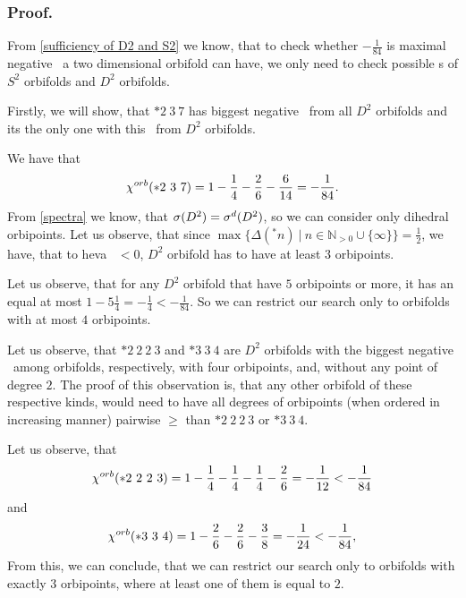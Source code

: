 \subsubsection{Proof.}
From \ref{sufficiency of D2 and S2} we know, that to check whether $-\frac{1}{84}$ is maximal 
negative \Eoc\ a two dimensional orbifold can have, we only need to check possible 
\Eoc s of $S^2$ orbifolds and $D^2$ orbifolds. 

Firstly, we will show, that $*2\ 3\ 7$ has biggest negative \Eoc\ from all $D^2$ orbifolds 
and its the only one with this \Eoc\ from $D^2$ orbifolds.

We have that 
\begin{equation}
{\chi^{orb}(*2\ 3\ 7)} = 1 - \frac{1}{4} - \frac{2}{6} - \frac{6}{14} = -\frac{1}{84}. 
\end{equation}
From \ref{spectra} we know, that ${{\sigma}(D^2)} = {\sigma}^d(D^2)$, so we can consider only dihedral 
orbipoints. 
Let us observe, that since 
$\max\{\Delta(^*n)\ |\ n \in \mathbb{N}_{>0} \cup \{\infty\}\} = \frac{1}{2}$, we have, that 
to heva \Eoc\ $<0$, 
$D^2$ orbifold has to have at least $3$ orbipoints.
 
Let us observe, that for any $D^2$ orbifold that have $5$ orbipoints or more, it has an \Eoc 
equal at most $1 - 5\frac{1}{4} = -\frac{1}{4} < -\frac{1}{84}$. So we can restrict our search 
only to orbifolds with at most $4$ orbipoints. 

Let us observe, that $*2\ 2\ 2\ 3$ and $* 3\ 3\ 4$ are $D^2$ orbifolds with the biggest 
negative \Eoc\ among orbifolds, respectively, with four orbipoints, and, without any 
point of degree $2$. The proof of this observation is, that any other orbifold of these 
respective kinds, would need to have all degrees of orbipoints (when ordered in increasing manner) 
pairwise $\geq$ than $*2\ 2\ 2\ 3$ or $* 3\ 3\ 4$.

Let us observe, that 
\begin{equation}
{\chi^{orb}(*2\ 2\ 2\ 3)} = 1 - \frac{1}{4} - \frac{1}{4} - \frac{1}{4} - \frac{2}{6} = -\frac{1}{12} 
< -\frac{1}{84}
\end{equation}
and
\begin{equation}
\cho{*3\ 3\ 4} = 1 - \frac{2}{6} - \frac{2}{6} - \frac{3}{8} = -\frac{1}{24} < -\frac{1}{84},
\end{equation}
From this, we can conclude, that we can restrict our search only to orbifolds with 
exactly $3$ orbipoints, where at least one of them is equal to $2$. 

